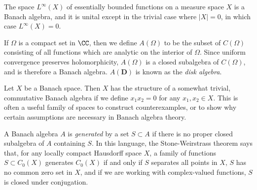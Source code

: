 \begin{example}
    The space $L^\infty(X)$ of essentially bounded functions on a measure space $X$ is a Banach algebra, and it is unital except in the trivial case where $|X| = 0$, in which case $L^\infty(X) = 0$.
\end{example}

\begin{example}
    If $\Omega$ is a compact set in $\CC$, then we define $A(\Omega)$ to be the subset of $C(\Omega)$ consisting of all functions which are analytic on the interior of $\Omega$. Since uniform convergence preserves holomorphicity, $A(\Omega)$ is a closed subalgebra of $C(\Omega)$, and is therefore a Banach algebra. $A(\mathbf{D})$ is known as the \emph{disk algebra}.
\end{example}

\begin{example}
    Let $X$ be a Banach space. Then $X$ has the structure of a somewhat trivial, commutative Banach algebra if we define $x_1 x_2 = 0$ for any $x_1,x_2 \in X$. This is often a useful family of spaces to construct counterexamples, or to show why certain assumptions are necessary in Banach algebra theory.
\end{example}

A Banach algebra $A$ is \emph{generated} by a set $S \subset A$ if there is no proper closed subalgebra of $A$ containing $S$. In this language, the Stone-Weirstrass theorem says that, for any locally compact Hausdorff space $X$, a family of functions $S \subset C_0(X)$ generates $C_0(X)$ if and only if $S$ separates all points in $X$, $S$ has no common zero set in $X$, and if we are working with complex-valued functions, $S$ is closed under conjugation.


